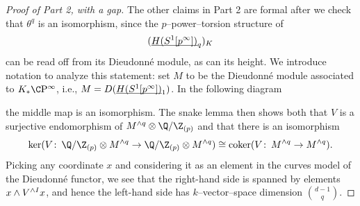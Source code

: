 \begin{proof}[Proof of Part 2, with a gap]\renewcommand{\qedsymbol}{\relax}
The other claims in Part 2 are formal after we check that \(\theta^q\) is an isomorphism, since the \(p\)--power--torsion structure of \[(\OS{H(S^1[p^\infty])}{q})_K\] can be read off from its Dieudonn\'e module, as can its height.
We introduce notation to analyze this statement: set \(M\) to be the Dieudonn\'e module associated to \(K_* \CP^\infty\), i.e., \(M = D(\OS{H(S^1[p^\infty])}{1})\).
In the following diagram
\begin{center}
\end{center}
the middle map is an isomorphism.
The snake lemma then shows both that \(V\) is a surjective endomorphism of \(M^{\wedge q} \otimes \Q/\Z_{(p)}\) and that there is an isomorphism \[\ker(V\co \Q/\Z_{(p)} \otimes M^{\wedge q} \to \Q/\Z_{(p)} \otimes M^{\wedge q}) \cong \operatorname{coker}(V\co M^{\wedge q} \to M^{\wedge q}).\]
Picking any coordinate \(x\) and considering it as an element in the curves model of the Dieudonn\'e functor, we see that the right-hand side is spanned by elements \(x \wedge V^{\wedge I} x\), and hence the left-hand side has \(k\)--vector--space dimension \(\binom{d-1}{q}\).


\end{proof}

